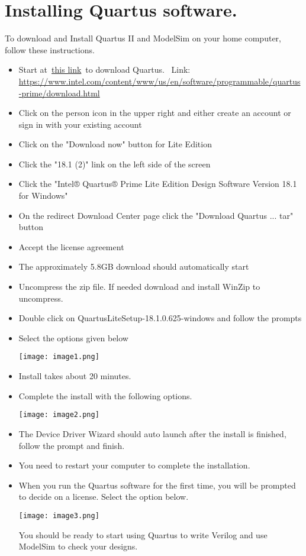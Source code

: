 \chapter{Installing Quartus software.}
\graphicspath{ {./Lab00HowTo/howTo00 Install Quartus/Fig} }

To download and Install Quartus II and ModelSim on your home computer,
follow these instructions.

\begin{itemize}
    \item
        Start
        at~\href{https://www.intel.com/content/www/us/en/software/programmable/quartus-prime/download.html}{this
        link}~to download Quartus.~
        Link:
        \url{https://www.intel.com/content/www/us/en/software/programmable/quartus-prime/download.html}
    \item
        Click on the person icon in the upper right and either create an
        account or sign in with your existing account
    \item
        Click on the "Download now" button for Lite Edition
    \item
        Click the "18.1 (2)" link on the left side of the screen
    \item
        Click the "Intel® Quartus® Prime Lite Edition Design Software Version
        18.1 for Windows"
    \item
        On the redirect Download Center page click the "Download Quartus ...
        tar" button
    \item
        Accept the license agreement
    \item
        The approximately 5.8GB download should automatically start
    \item
        Uncompress the zip file. If needed download and install WinZip to
        uncompress.
    \item
        Double click on QuartusLiteSetup-18.1.0.625-windows and follow the
        prompts
    \item
        Select the options given below

        \texttt{[image: image1.png]}

    \item
        Install takes about 20 minutes.
    \item
        Complete the install with the following options.

        \texttt{[image: image2.png]}

    \item
        The Device Driver Wizard should auto launch after the install is
        finished, follow the prompt and finish.
    \item
        You need to restart your computer to complete the installation.
    \item
        When you run the Quartus software for the first time, you will be
        prompted to decide on a license. Select the option below.

        \texttt{[image: image3.png]}

        You should be ready to start using Quartus to write Verilog and use
        ModelSim to check your designs.
\end{itemize}
